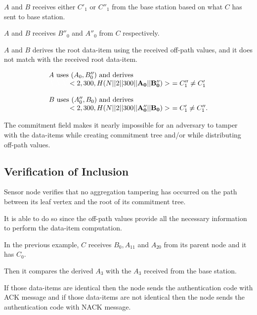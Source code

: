 \documentclass[%
  slidesonly,%
  semlayer%
  ]{seminar}                                  %
\begin{document}
\begin{slide}
        $A$ and $B$ receives either $C'_{1}$ or $C''_{1}$ from the base station based on what $C$ has sent to base station.

        $A$ and $B$ receives $B''_{0}$ and $A''_{0}$ from $C$ respectively.

        $A$ and $B$ derives the root data-item using the received off-path values, and it does not match with the received root data-item.

        \begin{equation*}
          \begin{array}{l}
            A\ \mbox{uses}\ (A_{0}, B''_{0})\ \mbox{and derives}\\
            \textcolor{white}{XXX} <2,300,H(N||2||300||\mathbf{A_{0}}||\mathbf{B''_{0}})>\  = C''_{1} \neq C'_{1} \\
            \\
            B\ \mbox{uses}\ (A''_{0}, B_{0})\ \mbox{and derives}\\
            \textcolor{white}{XXX} <2,300,H(N||2||300||\mathbf{A''_{0}}||\mathbf{B_{0}})>\ = C'_{1} \neq C''_{1}.
          \end{array}
        \end{equation*}

        The commitment field makes it nearly impossible for an adversary to tamper with the data-items while creating commitment tree and/or while distributing off-path values.
        \vfill
        \clearpage

    \subsection*{Verification of Inclusion}
        \vfill
        Sensor node verifies that no aggregation tampering has occurred on the path between its leaf vertex and the root of its commitment tree.

        It is able to do so since the off-path values provide all the necessary information to perform the data-item computation.

        In the previous example, $C$ receives $B_{0}, A_{11}$ and $ A_{20}$ from its parent node and it has $C_{0}$.
 
        Then it compares the derived $A_{3}$ with the $A_{3}$ received from the base station.

        If those data-items are identical then the node sends the authentication code with ACK message and if those data-items are not identical then the node sends the authentication code with NACK message.
        \vfill
        \clearpage


\end{slide}
\end{document}

